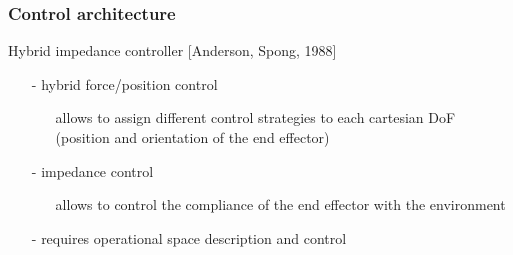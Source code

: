 \begin{frame}
  \frametitle{Control architecture}
  Hybrid impedance controller [Anderson, Spong, 1988]
  \begin{itemize}
  \item [-] hybrid force/position control
    \begin{itemize}
    \item[] allows to assign different control strategies to each cartesian DoF
      (position and orientation of the end effector)
    \end{itemize}
  \item [-] impedance control
    \begin{itemize}
    \item[] allows to control the compliance of the end effector with the environment
    \end{itemize}
  \item [-] requires {\color{red}operational space} description and control
  \end{itemize}
\end{frame}
